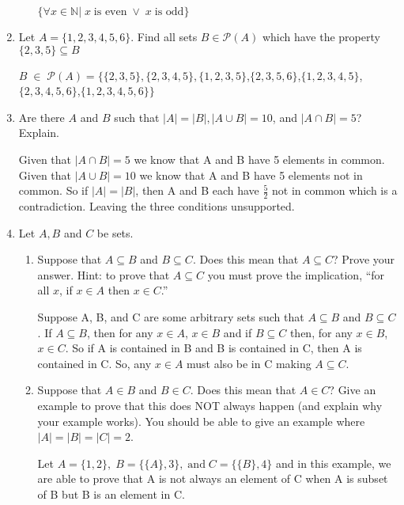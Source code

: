 \documentclass[11pt, a4paper]{article}
\newcommand\setItemNumber[1]{\setcounter{enumi}{\numexpr#1-1\relax}}
\begin{document}
\begin{enumerate}
\begin{enumerate}
                $\{\forall x\in\mathbb{N}|\; x\; \text{is even}\; \lor\; x\; \text{is odd}\}$ %

        \end{enumerate}

    \setItemNumber{19}
    \item Let $A = \{1,2,3,4,5,6\}$. Find all sets $B\in\mathcal{P}(A)$ which have the property $\{2,3,5\}\subseteq B$

        $B \;\in\;\mathcal{P}(A) = \{\{2,3,5\},\{2,3,4,5\},\{1,2,3,5\}$,$\{2,3,5,6\}$,$\{1,2,3,4,5\}$,$\{2,3,4,5,6\}$,$\{1,2,3,4,5,6\}\}$

    \setItemNumber{22}
    \item Are there $A$ and $B$ such that $|A| = |B|,|A\cup B| = 10$, and $|A\cap B| = 5$? Explain.

        Given that $|A\cap B|=5$ we know that A and B have 5 elements in common. Given that $|A\cup B|= 10$ we know that A and B have 5 elements not in common. So if $|A|=|B|$, then A and B each have $\frac{5}{2}$ not in common which is a contradiction. Leaving the three conditions unsupported.

    \setItemNumber{25}
    \item Let $A, B$ and $C$ be sets.
        \begin{enumerate}
            \item Suppose that $A \subseteq B$ and $B\subseteq C$. Does this mean that $A \subseteq C$? Prove your answer. Hint: to prove that $A\subseteq C$ you must prove the implication, “for all $x$, if $x\in A$ then $x\in C$.”\newline

                Suppose A, B, and C are some arbitrary sets such that $A\subseteq B$ and $B\subseteq C$. If $A\subseteq B$, then for any $x\in A$, $x\in B$ and if $B\subseteq C$ then, for any $x\in B$, $x\in C$. So if A is contained in B and B is contained in C, then A is contained in C. So, any $x\in A$ must also be in C making $A\subseteq C$.

            \item Suppose that $A\in B$ and $B\in C$. Does this mean that $A\in C$? Give an example to prove that this does NOT always happen (and explain why your example works). You should be able to give an example where $|A|=|B|=|C|=2$.\newline

        Let $A =\{1,2\},\;B = \{\{A\}, 3\},\;\text{and}\; C = \{\{B\},4\}$ and in this example, we are able to prove that A is not always an element of C when A is subset of B but B is an element in C. 
        \end{enumerate}


\end{enumerate}
\end{document}
